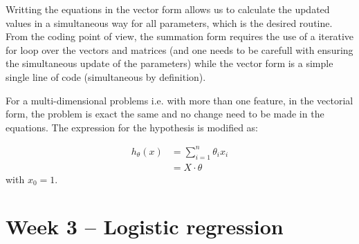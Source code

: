 \documentclass[
10pt, %
a4paper, %
oneside, %
headinclude,footinclude, %
BCOR5mm, %
]{scrartcl}
\begin{document}
Writting the equations in the vector form allows us to calculate the updated values in a simultaneous way for all parameters,
which is the desired routine. From the coding point of view, the summation form requires the use of a iterative for loop over the 
vectors and matrices (and one needs to be carefull with ensuring the simultaneous update of the parameters) while the vector form is a simple single line of code (simultaneous by definition).

For a multi-dimensional problems i.e. with more than one feature, in the vectorial form, the problem is exact the same and no change need 
to be made in the equations. The expression for the hypothesis is modified as:

\begin{equation}
    \begin{split}
        h_{\theta}(x) & = \sum_{i=1}^{n} \theta_{i} x_{i} \\
                        & = X \cdot \theta
    \end{split}
\end{equation}
with $x_{0} = 1$.

\section{Week 3 -- Logistic regression}








\end{document}
